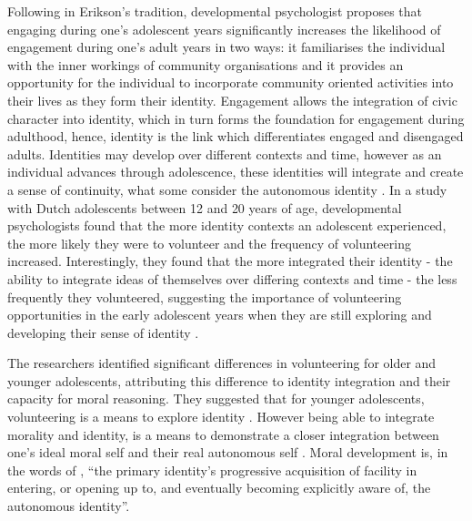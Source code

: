 Following in Erikson's tradition, developmental psychologist \citet{Youniss1997} proposes that engaging during one's adolescent years significantly increases the likelihood of engagement during one's adult years in two ways: it familiarises the individual with the inner workings of community organisations and it provides an opportunity for the individual to incorporate community oriented activities into their lives as they form their identity. Engagement allows the integration of civic character into identity, which in turn forms the foundation for engagement during adulthood, hence, identity is the link which differentiates engaged and disengaged adults. Identities may develop over different contexts and time, however as an individual advances through adolescence, these identities will integrate and create a sense of continuity, what some consider the autonomous identity \citep{Kroger2006,Davidson1991}. In a study with Dutch adolescents between 12 and 20 years of age, developmental psychologists \citet{VanGoethem2012} found that the more identity contexts an adolescent experienced, the more likely they were to volunteer and the frequency of volunteering increased. Interestingly, they found that the more integrated their identity - the ability to integrate ideas of themselves over differing contexts and time - the less frequently they volunteered, suggesting the importance of volunteering opportunities in the early adolescent years when they are still exploring and developing their sense of identity \citep{VanGoethem2012}. 

The researchers identified significant differences in volunteering for older and younger adolescents, attributing this difference to identity integration and their capacity for moral reasoning. They suggested that for younger adolescents, volunteering is a means to explore identity \citep{VanGoethem2012}. However being able to integrate morality and identity, is a means to demonstrate a closer integration between one's ideal moral self and their real autonomous self \citep{Youniss1999a}. Moral development is, in the words of \citet[][p119]{Davidson1991}, “the primary identity's progressive acquisition of facility in entering, or opening up to, and eventually becoming explicitly aware of, the autonomous identity”. 

